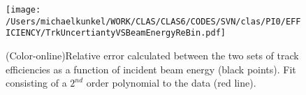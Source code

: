 				
				
				
				
				\begin{figure}[h!]\begin{center}
						\texttt{[image: /Users/michaelkunkel/WORK/CLAS/CLAS6/CODES/SVN/clas/PI0/EFFICIENCY/TrkUncertiantyVSBeamEnergyReBin.pdf]}
						\caption{(Color-online)Relative error calculated between the two sets of track efficiencies as a function of incident beam energy (black points). Fit consisting of a $2^{nd}$ order polynomial to the data (red line). }\label{fig:toteff_error}
					\end{center}\end{figure}
					
\FloatBarrier
